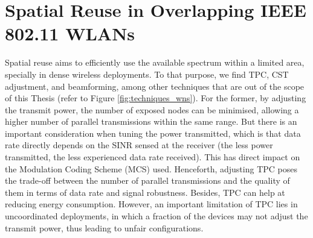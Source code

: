 \documentclass[12pt, a4paper,twoside]{tesi_upf}
\begin{document}
		\section{Spatial Reuse in Overlapping IEEE 802.11 WLANs}
		\label{section:spatial_reuse}	
			Spatial reuse aims to efficiently use the available spectrum within a limited area, specially in dense wireless deployments. To that purpose, we find TPC, CST adjustment, and beamforming, among other techniques that are out of the scope of this Thesis (refer to Figure \ref{fig:techniques_wns}). For the former, by adjusting the transmit power, the number of exposed nodes can be minimised, allowing a higher number of parallel transmissions within the same range. But there is an important consideration when tuning the power transmitted, which is that data rate directly depends on the SINR sensed at the receiver (the less power transmitted, the less experienced data rate received). This has direct impact on the Modulation Coding Scheme (MCS) used. Henceforth, adjusting TPC poses the trade-off between the number of parallel transmissions and the quality of them in terms of data rate and signal robustness. Besides, TPC can help at reducing energy consumption. However, an important limitation of TPC lies in uncoordinated deployments, in which a fraction of the devices may not adjust the transmit power, thus leading to unfair configurations.			
			
\end{document}
